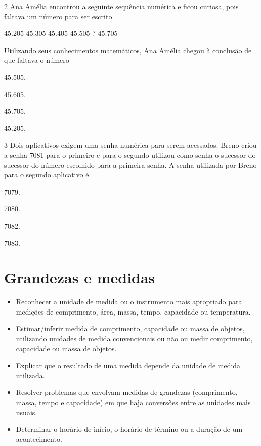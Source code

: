 \pagebreak
\num{2} Ana Amélia encontrou a seguinte sequência numérica e ficou curiosa, pois
faltava um número para ser escrito.

\begin{mdframed}[linewidth=2pt,linecolor=azul!20,backgroundcolor=azul!20,roundcorner=2pt]
45.205 \hfill 45.305 \hfill 45.405 \hfill 45.505 \hfill ? \hfill 45.705 \hfill
\end{mdframed}

Utilizando seus conhecimentos matemáticos, Ana Amélia chegou à conclusão de que
faltava o número

\begin{escolha}
\item
  45.505.
\item
  45.605.
\item
  45.705.
\item
  45.205.
\end{escolha}

\num{3} Dois aplicativos exigem uma senha numérica para serem acessados. Breno
criou a senha 7081 para o primeiro e para o segundo utilizou como senha
o sucessor do sucessor do número escolhido para a primeira senha. A
senha utilizada por Breno para o segundo aplicativo é

\begin{escolha}
\item
  7079.
\item
  7080.
\item
  7082.
\item
  7083.
\end{escolha}

\chapter{Grandezas e medidas}


\begin{itemize}
\item Reconhecer a unidade de medida ou o instrumento mais apropriado para
medições de comprimento, área, massa, tempo, capacidade ou temperatura.

\item Estimar/inferir medida de comprimento, capacidade ou massa de objetos,
utilizando unidades de medida convencionais ou não ou medir comprimento,
capacidade ou massa de objetos.

\item Explicar que o resultado de uma medida depende da unidade de medida
utilizada.

\item Resolver problemas que envolvam medidas de grandezas (comprimento,
massa, tempo e capacidade) em que haja conversões entre as unidades mais
usuais.

\item Determinar o horário de início, o horário de término ou a duração de
um acontecimento.
\end{itemize}

